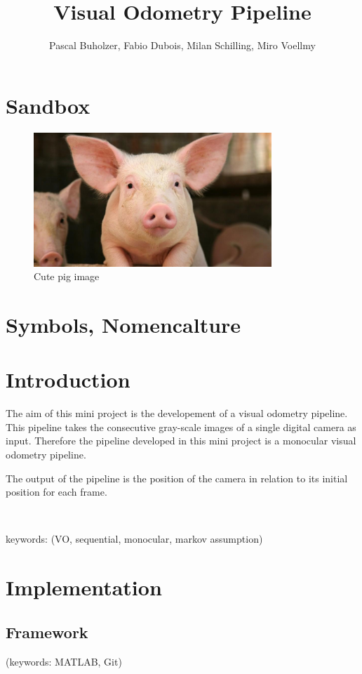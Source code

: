 \documentclass[a4paper,10pt]{article} %
\begin{document}
\title{Visual Odometry Pipeline}
\author{Pascal Buholzer, Fabio Dubois, Milan Schilling, Miro Voellmy}
\maketitle

\section{Sandbox}
\begin{figure}[ht]
	\includegraphics[width=0.8\textwidth]{pig}
	\caption{Cute pig image}
	\label{img_pig}
\end{figure}

\newpage
\section{Symbols, Nomencalture}

\newpage
\section{Introduction}
The aim of this mini project is the developement of a visual odometry pipeline. This pipeline takes the consecutive gray-scale images of a single digital camera as input. Therefore the pipeline developed in this mini project is a monocular visual odometry pipeline.

The output of the pipeline is the position of the camera in relation to its initial position for each frame.

\

keywords:
(VO, sequential, monocular, markov assumption)

\section{Implementation}

\subsection{Framework}
(keywords: MATLAB, Git)
\end{document}
